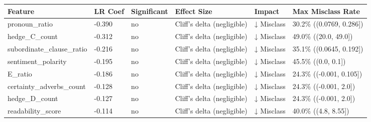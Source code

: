 \begin{tabular}{llllll}
\toprule
Feature & LR Coef & Significant & Effect Size & Impact & Max Misclass Rate \\
\midrule
pronoun\_ratio & -0.390 & no & Cliff's delta (negligible) & ↓ Misclass & 30.2\% ((0.0769, 0.286]) \\
hedge\_C\_count & -0.312 & no & Cliff's delta (negligible) & ↓ Misclass & 49.0\% ((20.0, 49.0]) \\
subordinate\_clause\_ratio & -0.216 & no & Cliff's delta (negligible) & ↓ Misclass & 35.1\% ((0.0645, 0.192]) \\
sentiment\_polarity & -0.195 & no & Cliff's delta (negligible) & ↓ Misclass & 45.5\% ((0.0, 0.1]) \\
E\_ratio & -0.186 & no & Cliff's delta (negligible) & ↓ Misclass & 24.3\% ((-0.001, 0.105]) \\
certainty\_adverbs\_count & -0.128 & no & Cliff's delta (negligible) & ↓ Misclass & 24.3\% ((-0.001, 2.0]) \\
hedge\_D\_count & -0.127 & no & Cliff's delta (negligible) & ↓ Misclass & 24.3\% ((-0.001, 2.0]) \\
readability\_score & -0.114 & no & Cliff's delta (negligible) & ↓ Misclass & 40.0\% ((4.8, 8.55]) \\
\bottomrule
\end{tabular}
